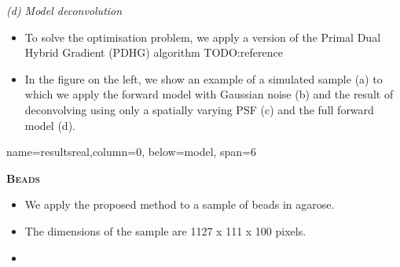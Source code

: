 \documentclass[a0paper,portrait,fontscale=0.35]{baposter}
\newcommand{\mycaption}[1]{
  {
    \smaller
    \emph{#1}
  }
}
\theoremstyle{plain}
\theoremstyle{plain}
\theoremstyle{definition}
\theoremstyle{plain}
\theoremstyle{definition}
\begin{document}
\begin{poster}
{\begin{minipage}[t]{0.49\textwidth}
\begin{minipage}[t]{0.49\textwidth}
        \vspace{-0.3em}
        \mycaption{
          (d) Model deconvolution
        }
      \end{minipage}
    \end{minipage}
    \hspace{1.5em}
    \begin{minipage}[t]{0.45\textwidth}
      \begin{itemize}
        \item To solve the optimisation problem, we apply a version
          of the Primal Dual Hybrid Gradient (PDHG) algorithm TODO:reference

        \item In the figure on the left, we show an example of a simulated sample (a) 
          to which we apply the forward model with Gaussian noise (b)
          and the result of deconvolving using only a spatially varying
          PSF (c) and the full forward model (d).
      \end{itemize}
    \end{minipage}
}

{name=resultsreal,column=0, below=model, span=6}{
  \begin{minipage}[t]{0.51\textwidth} 
    \begin{center}
      \larger
      \textbf{\textsc{Beads}}
    \end{center}

   \hspace{-2em}
    \begin{minipage}[t]{0.49\textwidth}
      \begin{itemize}
        \item We apply the proposed method to a sample of 
          beads in agarose.
        \item The dimensions of the sample are 1127 x 111 x 100 pixels.

        \item
      \end{itemize}
    \end{minipage}
    \begin{minipage}[t]{0.49\textwidth}
      \centering


\end{minipage}
\end{minipage}}
\end{poster}
\end{document}

